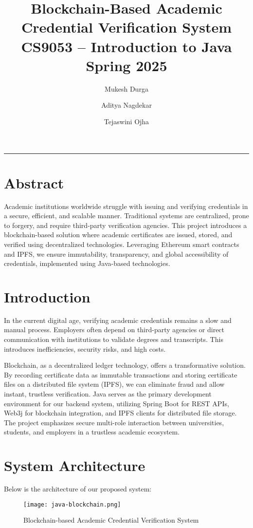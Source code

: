 \documentclass[12pt]{article}
\title{\textbf{Blockchain-Based Academic Credential Verification System} \\[0.5em]
\large CS9053 – Introduction to Java \\ Spring 2025}
\author{
    Mukesh Durga \\ \textt{md6256@nyu.edu} \and
    Aditya Nagdekar \\ \textt{an4744@nyu.edu} \and
    Tejaswini Ojha \\ \textt{to2226@nyu.edu}
}
\begin{document}
\maketitle
\hrule
\vspace{1em}

\section*{Abstract}
Academic institutions worldwide struggle with issuing and verifying credentials in a secure, efficient, and scalable manner. Traditional systems are centralized, prone to forgery, and require third-party verification agencies. This project introduces a blockchain-based solution where academic certificates are issued, stored, and verified using decentralized technologies. Leveraging Ethereum smart contracts and IPFS, we ensure immutability, transparency, and global accessibility of credentials, implemented using Java-based technologies.

\section*{Introduction}
In the current digital age, verifying academic credentials remains a slow and manual process. Employers often depend on third-party agencies or direct communication with institutions to validate degrees and transcripts. This introduces inefficiencies, security risks, and high costs.

Blockchain, as a decentralized ledger technology, offers a transformative solution. By recording certificate data as immutable transactions and storing certificate files on a distributed file system (IPFS), we can eliminate fraud and allow instant, trustless verification. Java serves as the primary development environment for our backend system, utilizing Spring Boot for REST APIs, Web3j for blockchain integration, and IPFS clients for distributed file storage. The project emphasizes secure multi-role interaction between universities, students, and employers in a trustless academic ecosystem.

\newpage

\section*{System Architecture}
Below is the architecture of our proposed system:

\begin{figure}[htbp]
    \centering
    \texttt{[image: java-blockchain.png]}
    \caption{Blockchain-based Academic Credential Verification System}
    \label{fig:system_arch}
\end{figure}
\end{document}
